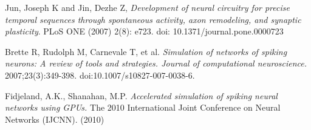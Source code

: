 \documentclass[a4paper]{article}
\begin{document}

\begin{thebibliography}{9}
Jun, Joseph K and Jin, Dezhe Z,
\emph{Development of neural circuitry for precise temporal sequences through spontaneous activity, axon remodeling, and synaptic plasticity}.
PLoS ONE (2007) 2(8): e723. doi: 10.1371/journal.pone.0000723

Brette R, Rudolph M, Carnevale T, et al.
\emph{Simulation of networks of spiking neurons: A review of tools and strategies. Journal of computational neuroscience.}
2007;23(3):349-398. doi:10.1007/s10827-007-0038-6.

Fidjeland, A.K.,  Shanahan, M.P.
\emph{Accelerated simulation of spiking neural networks using GPUs.}
The 2010 International Joint Conference on Neural Networks (IJCNN). (2010)
\end{thebibliography}
\end{document}
